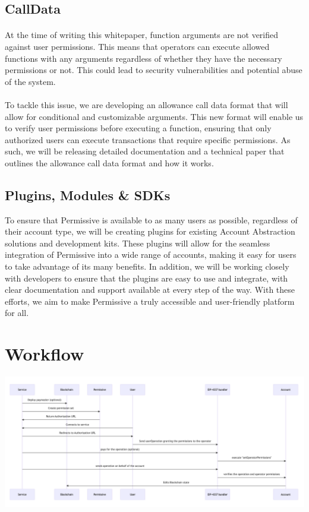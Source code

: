 \documentclass{article}
\begin{document}
\subsection{CallData}
\paragraph{}
At the time of writing this whitepaper, function arguments are not verified against user permissions. This means that operators can execute allowed functions with any arguments regardless of whether they have the necessary permissions or not. This could lead to security vulnerabilities and potential abuse of the system.
\paragraph{}
To tackle this issue, we are developing an allowance call data format that will allow for conditional and customizable arguments. This new format will enable us to verify user permissions before executing a function, ensuring that only authorized users can execute transactions that require specific permissions. As such, we will be releasing detailed documentation and a technical paper that outlines the allowance call data format and how it works.
\subsection{Plugins, Modules \& SDKs}
To ensure that Permissive is available to as many users as possible, regardless of their account type, we will be creating plugins for existing Account Abstraction solutions and development kits. These plugins will allow for the seamless integration of Permissive into a wide range of accounts, making it easy for users to take advantage of its many benefits. In addition, we will be working closely with developers to ensure that the plugins are easy to use and integrate, with clear documentation and support available at every step of the way. With these efforts, we aim to make Permissive a truly accessible and user-friendly platform for all.
\section{Workflow}
\begin{center}
    \includegraphics[scale=0.2]{schema.png}
\end{center}
\end{document}
